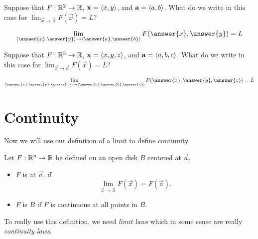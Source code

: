 \documentclass{ximera}
\begin{document}
\begin{question}
  Suppose that $F:\mathbb R^2\to\mathbb R$, $\mathbf{x} = \left\langle x,y\right\rangle$, and $\mathbf{a} =
  \left\langle a,b\right\rangle$. What do we write in this case for $\lim_{\vec{x}\to
    \vec{a}} F(\vec{x}) = L$?
  \begin{prompt}
    \[
    \lim_{\vector{\answer{x},\answer{y}}\to \vector{\answer{a},\answer{b}}} F(\answer{x},\answer{y}) = L
    \]
  \end{prompt}
  \begin{question}
    Suppose that $F:\mathbb R^3\to\mathbb R$, $\mathbf{x} = \left\langle x,y,z\right\rangle$, and $\mathbf{a} =
    \left\langle a,b,c\right\rangle$. What do we write in this case for $\lim_{\vec{x}\to
      \vec{a}} F(\vec{x}) = L$?
    \begin{prompt}
      \[
      \lim_{\vector{\answer{x},\answer{y},\answer{z}}\to \vector{\answer{a},\answer{b},\answer{c}}} F(\answer{x},\answer{y},\answer{z}) = L
      \]
    \end{prompt}
  \end{question}
\end{question}

\section{Continuity}

Now we will use our definition of a limit to define continuity.

\begin{definition}
  Let $F:\mathbb R^n\to \mathbb R$ be defined on an open disk $B$ centered at
  $\vec{a}$.
  \begin{itemize}
  \item $F$ is  at $\vec{a}$, if
    \[
    \lim_{\vec{x}\to\vec{a}} F(\vec{x}) = F(\vec{a}).
    \]
  \item $F$ is  $B$ if $F$ is
    continuous at all points in $B$.
  \end{itemize}
\end{definition}

To really use this definition, we need \textit{limit laws} which in
some sense are really \textit{continuity laws}.
\end{document}
